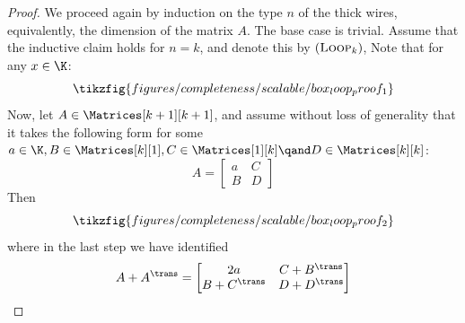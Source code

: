 \begin{proof}
  We proceed again by induction on the type \(n\) of the thick wires,
  equivalently, the dimension of the matrix \(A\).  The base case is trivial.  Assume that the inductive claim holds for \(n=k\), and denote this by \((\textsc{Loop}_k)\),
  Note that for any \(x \in \K\):
  \begin{equation}
    \label{eq:box_loop_thin}
    \tikzfig{figures/completeness/scalable/box_loop_proof_1}
  \end{equation}
  Now, let \(A \in\Matrices[k+1][k+1]\), and assume without loss of
  generality that it takes the following form for some \(a \in \K, B \in \Matrices[k][1], C \in
     \Matrices[1][k] \qand D \in  \Matrices[k][k]\):
  \begin{equation}
    A =
    \begin{bmatrix}
      a & C \\ B & D 
    \end{bmatrix}
  \end{equation}
Then
  \begin{equation}
    \tikzfig{figures/completeness/scalable/box_loop_proof_2}
  \end{equation}
  where in the last step we have identified
  \begin{equation}
    A + A^\trans = \begin{bmatrix}
      2a & C + B^\trans
      \\ B + C^\trans & D + D^\trans
    \end{bmatrix}
  \end{equation}
\end{proof}
